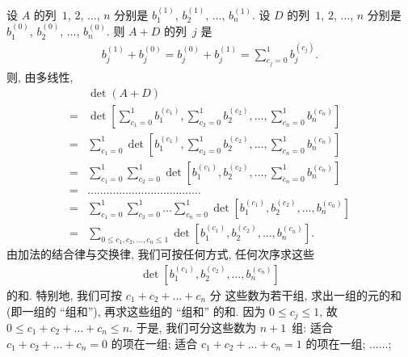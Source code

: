 \begin{example}
    设 \(A\) 的列~\(1\), \(2\), \(\dots\), \(n\)
    分别是 \(b_1^{(1)}\), \(b_2^{(1)}\), \(\dots\), \(b_n^{(1)}\).
    设 \(D\) 的列~\(1\), \(2\), \(\dots\), \(n\)
    分别是 \(b_1^{(0)}\), \(b_2^{(0)}\), \(\dots\), \(b_n^{(0)}\).
    则 \(A + D\) 的列~\(j\) 是
    \begin{align*}
        b_j^{(1)} + b_j^{(0)}
        = b_j^{(0)} + b_j^{(1)}
        = \sum_{c_j = 0}^{1} {b_j^{(c_j)}}.
    \end{align*}
    则, 由多线性,
    \begin{align*}
             &
        \det {(A + D)}
        \\
        = {} &
        \det {\left[
        \sum_{c_1 = 0}^{1} b_1^{(c_1)},
        \sum_{c_2 = 0}^{1} b_2^{(c_2)},
        \dots,
        \sum_{c_n = 0}^{1} b_n^{(c_n)}
        \right]}
        \\
        = {} &
        \sum_{c_1 = 0}^{1}
        \det {\left[
        b_1^{(c_1)},
        \sum_{c_2 = 0}^{1} b_2^{(c_2)},
        \dots,
        \sum_{c_n = 0}^{1} b_n^{(c_n)}
        \right]}
        \\
        = {} &
        \sum_{c_1 = 0}^{1}
        \sum_{c_2 = 0}^{1}
        \det {\left[
        b_1^{(c_1)},
        b_2^{(c_2)},
        \dots,
        \sum_{c_n = 0}^{1} b_n^{(c_n)}
        \right]}
        \\
        = {} &
        \dots \dots \dots \dots
        \dots \dots \dots \dots
        \dots \dots \dots \dots
        \\
        = {} &
        \sum_{c_1 = 0}^{1}
        \sum_{c_2 = 0}^{1}
        \dots
        \sum_{c_n = 0}^{1}
        \det {[b_1^{(c_1)}, b_2^{(c_2)}, \dots, b_n^{(c_n)}]}
        \\
        = {} &
        \sum_{0 \leq c_1, c_2, \dots, c_n \leq 1}
        \det {[b_1^{(c_1)}, b_2^{(c_2)}, \dots, b_n^{(c_n)}]}.
    \end{align*}
    由加法的结合律与交换律,
    我们可按任何方式, 任何次序求这些
    \begin{align*}
        \det {[b_1^{(c_1)}, b_2^{(c_2)}, \dots, b_n^{(c_n)}]}
    \end{align*}
    的和.
    特别地, 我们可按 \(c_1 + c_2 + \dots + c_n\) 分%
    这些数为若干组,
    求出一组的元的和 (即一组的 ``组和''),
    再求这些组的 ``组和'' 的和.
    因为 \(0 \leq c_j \leq 1\),
    故 \(0 \leq c_1 + c_2 + \dots + c_n \leq n\).
    于是, 我们可分这些数为 \(n+1\)~组:
    适合 \(c_1 + c_2 + \dots + c_n = 0\) 的项在一组;
    适合 \(c_1 + c_2 + \dots + c_n = 1\) 的项在一组;
    \(\dots \dots\);

\end{example}
